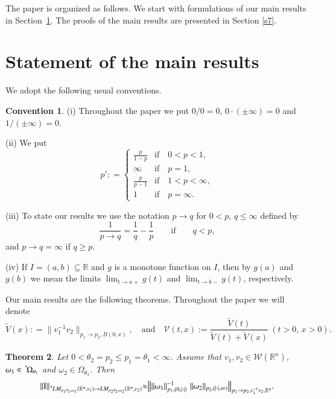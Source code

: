 \documentclass[11pt]{amsart}
\theoremstyle{plain}
\newtheorem{thm}{Theorem}[section]
\theoremstyle{definition}
\newtheorem{conv}[thm]{Convention}
\numberwithin{thm}{section}
\numberwithin{equation}{section}
\begin{document}
The paper is organized as follows. We start with formulations of our main results  in Section~\ref{main.res.}. The proofs of the main results are presented in Section \ref{s7}.

\section{Statement of the main results}\label{main.res.}

We adopt the following usual conventions.
\begin{conv}\label{Notat.and.prelim.conv.1.1}
	{\rm (i)} Throughout the paper we put $0/0 = 0$, $0 \cdot (\pm {\infty}) =
	0$ and $1 / (\pm{\infty}) =0$.
	
	{\rm (ii)} We put
	$$
	p' : = \left\{\begin{array}{cl} \frac p{1-p} & \text{if} \quad 0<p<1,\\
	\infty &\text{if}\quad p=1, \\
	\frac p{p-1}  &\text{if}\quad 1<p<\infty,\\
	1  &\text{if}\quad p=\infty.
	\end{array}
	\right.
	$$
	
	{\rm (iii)} To state our results we use the notation $p {\rightarrow} q$ for $0 < p,\,q
	\le \infty$ defined by
	$$
	\frac{1}{p {\rightarrow} q} = \frac{1}{q} - \frac{1}{p} {\qquad} \mbox{if} {\qquad} q <
	p,
	$$
	and $p {\rightarrow} q = \infty$ if $q \ge p$.
	
	{\rm (iv)} If $I = (a,b) \subseteq {\mathbb R}$ and $g$ is a monotone
	function on $I$, then by $g(a)$ and $g(b)$ we mean the limits
	$\lim_{t{\rightarrow} a+}g(t)$ and $\lim_{t{\rightarrow} b-}g(t)$, respectively.
\end{conv}

Our main results are the following theorems.
Throughout the paper we will denote
$$
\widetilde{V}(x) : = \| v_1^{-1}v_2\|_{p_1 {\rightarrow} 	p_2,B(0,x)}, \quad \mbox{and} \quad {\mathcal V}(t,x):= \frac{\widetilde{V}(t)}{\widetilde{V}(t)+\widetilde{V}(x)} ~ (t > 0,\,x > 0).
$$
\begin{thm}\label{main01}
	Let $0 < {\theta}_2 = p_2 \leq p_1 = {\theta}_1 < \infty$. Assume that $v_1, v_2\in {{\mathcal W}}({{\mathbb R}^n})$, ${\omega}_1\in {\,^{^{\bf c}}\!}{{\Omega}_{{\theta}_1}}$ and ${\omega}_2 \in {\Omega}_{{\theta}_2}$. Then
	\begin{equation*}
	\|{\operatorname{I}}\|_{{\,^{^{\bf c}}\!} LM_{p_1{\theta}_1,{\omega}_1}({{\mathbb R}^n},v_1){\rightarrow} LM_{p_2{\theta}_2,{\omega}_2}({{\mathbb R}^n},v_2)}{\approx} \big\|\|{\omega}_1\|_{p_1,(0,|\cdot|)}^{-1} \,\, \|{\omega}_2\|_{p_2,(|\cdot|,\infty)} \big\|_{p_1{\rightarrow} p_2,v_1^{-1}v_2,{{\mathbb R}^n}}.
	\end{equation*}
\end{thm}
\end{document}
